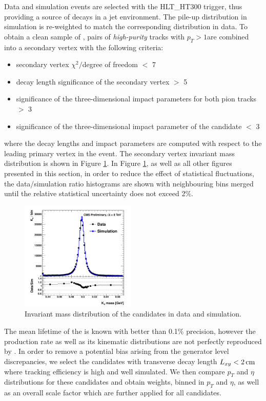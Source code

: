 Data and simulation events are selected with the HLT\_HT300 trigger, thus providing
a source of \Kshort decays in a jet environment. The pile-up distribution in simulation is re-weighted
to match the corresponding distribution in data. 
To obtain a clean sample of \Kshort, pairs of {\it high-purity} tracks with $p_T>1$\GeV are combined
 into a secondary 
vertex with the following criteria:
\begin{itemize}
 \item secondary vertex $\chi^2/$degree of freedom $<$ 7
 \item decay length significance of the secondary vertex $>$ 5
 \item significance of the three-dimensional impact parameters for both pion tracks $>$ 3
 \item significance of the three-dimensional impact parameter of the \Kshort candidate $<$ 3 
\end{itemize}
where the decay lengths and impact parameters are computed with respect to the leading primary vertex
in the event.
The secondary vertex invariant mass distribution is shown in Figure \ref{fig:ksmass}. 
In Figure \ref{fig:ksmass}, as well as all other figures
presented in this section, in order to reduce the effect of statistical fluctuations, 
the data/simulation ratio histograms are shown with neighbouring bins merged until the
relative statistical uncertainty does not exceed 2\%. 

\begin{figure}[htbp]
\centering
\includegraphics[width=0.49\textwidth]{plots/kshort/ksmass.pdf}
\caption{Invariant mass distribution of the \Kshort candidates in data and simulation. \label{fig:ksmass}}
\end{figure} 


The mean lifetime of the \Kshort is known with better than 0.1\% precision, however the \Kshort
production rate as well as its kinematic distributions are not perfectly reproduced 
by \PYTHIA \cite{Khachatryan:2011tm}.
In order to remove a potential bias arising from the generator level discrepancies, 
we select the \Kshort candidates with transverse decay length $L_{xy}<2\,\text{cm}$ where tracking efficiency
is high and well simulated. We then compare $p_T$ and $\eta$ distributions for these candidates and obtain
weights, binned in $p_T$ and $\eta$, as well as an overall scale factor which are further
 applied for all \Kshort candidates. 

